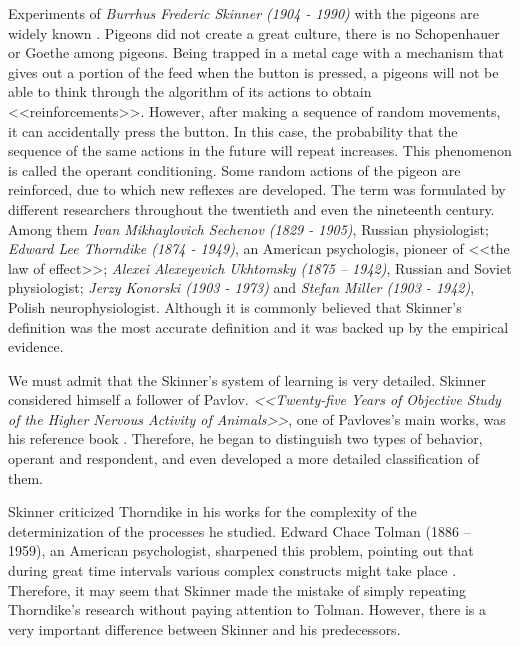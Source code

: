 \documentclass[14pt,a4paper]{scrartcl}
\begin{document}
Experiments of \textit{Burrhus Frederic Skinner (1904 - 1990)} with the pigeons are widely known \cite{Skinner1948,Lanza1982,Epstein1981}. Pigeons did not create a great culture, there is no Schopenhauer or Goethe among pigeons. Being trapped in a metal cage with a mechanism that gives out a portion of the feed when the button is pressed, a pigeons will not be able to think through the algorithm of its actions to obtain <<reinforcements>>. However, after making a sequence of random movements, it can accidentally press the button. In this case, the probability that the sequence of the same actions in the future will repeat increases. This phenomenon is called the operant conditioning. Some random actions of the pigeon are reinforced, due to which new reflexes are developed. The term was formulated by different researchers throughout the twentieth and even the nineteenth century. Among them \textit{Ivan Mikhaylovich Sechenov (1829 - 1905)}, Russian physiologist; \textit{Edward Lee Thorndike (1874 - 1949)}, an American psychologis, pioneer of <<the law of effect>>; \textit{Alexei Alexeyevich Ukhtomsky (1875 – 1942)}, Russian and Soviet physiologist; \textit{Jerzy Konorski (1903 - 1973)} and \textit{Stefan Miller (1903 - 1942)}, Polish neurophysiologist. Although it is commonly believed that Skinner's definition was the most accurate definition and it was backed up by the empirical evidence. 

We must admit that the Skinner's system of learning is very detailed. Skinner considered himself a follower of Pavlov. \textit{<<Twenty-five Years of Objective Study of the Higher Nervous Activity of Animals>>}, one of Pavloves's main works, was his reference book \cite{Skinner1971}. Therefore, he began to distinguish two types of behavior, operant and respondent, and even developed a more detailed classification of them. 

Skinner criticized Thorndike in his works for the complexity of the determinization of the processes he studied. Edward Chace Tolman (1886 – 1959), an American psychologist, sharpened this problem, pointing out that during great time intervals various complex constructs might take place \cite{Tolman1948}. Therefore, it may seem that Skinner made the mistake of simply repeating Thorndike's research without paying attention to Tolman. However, there is a very important difference between Skinner and his predecessors.
\end{document}
